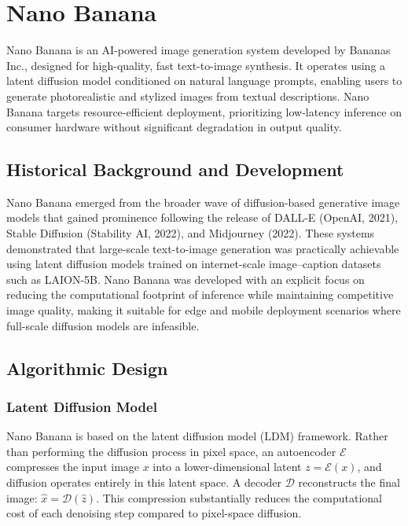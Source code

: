 \documentclass[11pt,a4paper]{report}
\begin{document}

\section{Nano Banana}
Nano Banana is an AI-powered image generation system developed by Bananas Inc., designed for high-quality,
fast text-to-image synthesis. It operates using a latent diffusion model conditioned on natural language
prompts, enabling users to generate photorealistic and stylized images from textual descriptions. Nano Banana
targets resource-efficient deployment, prioritizing low-latency inference on consumer hardware without
significant degradation in output quality.

\subsection{Historical Background and Development}
Nano Banana emerged from the broader wave of diffusion-based generative image models that gained prominence
following the release of DALL-E (OpenAI, 2021), Stable Diffusion (Stability AI, 2022), and Midjourney (2022).
These systems demonstrated that large-scale text-to-image generation was practically achievable using latent
diffusion models trained on internet-scale image--caption datasets such as LAION-5B. Nano Banana was developed
with an explicit focus on reducing the computational footprint of inference while maintaining competitive image
quality, making it suitable for edge and mobile deployment scenarios where full-scale diffusion models are
infeasible.

\subsection{Algorithmic Design}

\subsubsection{Latent Diffusion Model}
Nano Banana is based on the latent diffusion model (LDM) framework. Rather than performing the diffusion
process in pixel space, an autoencoder $\mathcal{E}$ compresses the input image $x$ into a lower-dimensional
latent $z = \mathcal{E}(x)$, and diffusion operates entirely in this latent space. A decoder $\mathcal{D}$
reconstructs the final image: $\hat{x} = \mathcal{D}(\hat{z})$. This compression substantially reduces the
computational cost of each denoising step compared to pixel-space diffusion.
\end{document}
